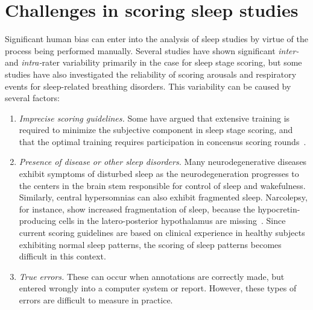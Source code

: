         
        
    
    \section{Challenges in scoring sleep studies}\label{sec:challenges-scoring-sleep-studies}
        Significant human bias can enter into the analysis of sleep studies by virtue of the process being performed manually.
        Several studies have shown significant \textit{inter-} and \textit{intra-}rater variability primarily in the case for sleep stage scoring, but some studies have also investigated the reliability of scoring arousals and respiratory events for sleep-related breathing disorders.
        This variability can be caused by several factors:
        \begin{enumerate}
            \item \textit{Imprecise scoring guidelines.}
            Some have argued that extensive training is required to minimize the subjective component in sleep stage scoring, and that the optimal training requires participation in concensus scoring rounds~\cite{Penzel2013}.
            \item \textit{Presence of disease or other sleep disorders.}
            Many neurodegenerative diseases exhibit symptoms of disturbed sleep as the neurodegeneration progresses to the centers in the brain stem responsible for control of sleep and wakefulness.
            Similarly, central hypersomnias can also exhibit fragmented sleep.
            Narcolepsy, for instance, show increased fragmentation of sleep, because the hypocretin-producing cells in the latero-posterior hypothalamus are missing~\cite{Kornum2017a}.
            Since current scoring guidelines are based on clinical experience in healthy subjects exhibiting normal sleep patterns, the scoring of sleep patterns becomes difficult in this context.
            \item \textit{True errors.}
            These can occur when annotations are correctly made, but entered wrongly into a computer system or report. 
            However, these types of errors are difficult to measure in practice.
        \end{enumerate}
        
